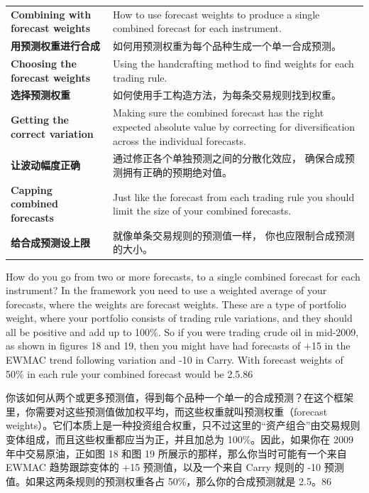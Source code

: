 \begin{bilingualtableblock} \begin{tabularx}{\textwidth}{@{} L{0.30\textwidth} Y@{}}\textbf{Combining with forecast weights} & How to use forecast weights to produce a single combined forecast for each instrument. \\

\textbf{用预测权重进行合成} & 如何用预测权重为每个品种生成一个单一合成预测。 \\
\textbf{Choosing the forecast weights} & Using the handcrafting method to find weights for each trading rule. \\
\textbf{选择预测权重} & 如何使用手工构造方法，为每条交易规则找到权重。 \\
\textbf{Getting the correct variation} & Making sure the combined forecast has the right expected absolute value by correcting for diversification across the individual forecasts. \\
\textbf{让波动幅度正确} & 通过修正各个单独预测之间的分散化效应， 确保合成预测拥有正确的预期绝对值。 \\
\textbf{Capping combined forecasts} & Just like the forecast from each trading rule you should limit the size of your combined forecasts. \\
\textbf{给合成预测设上限} & 就像单条交易规则的预测值一样， 你也应限制合成预测的大小。 \\
\end{tabularx}
\end{bilingualtableblock}


\begin{englishblock} How do you go from two or more forecasts, to a single combined forecast for each instrument? In the framework you need to use a weighted average of your forecasts, where the weights are forecast weights. These are a type of portfolio weight, where your portfolio consists of trading rule variations, and they should all be positive and add up to 100\%. So if you were trading crude oil in mid-2009, as shown in figures 18 and 19, then you might have had forecasts of +15 in the EWMAC trend following variation and -10 in Carry. With forecast weights of 50\% in each rule your combined forecast would be 2.5.86 \end{englishblock}

\begin{chineseblock}你该如何从两个或更多预测值，得到每个品种一个单一的合成预测？在这个框架里，你需要对这些预测值做加权平均，而这些权重就叫预测权重（forecast weights）。它们本质上是一种投资组合权重，只不过这里的“资产组合”由交易规则变体组成，而且这些权重都应当为正，并且加总为 100\%。因此，如果你在 2009 年中交易原油，正如图 18 和图 19 所展示的那样，那么你当时可能有一个来自 EWMAC 趋势跟踪变体的 +15 预测值，以及一个来自 Carry 规则的 -10 预测值。如果这两条规则的预测权重各占 50\%，那么你的合成预测就是 2.5。86 \end{chineseblock}

